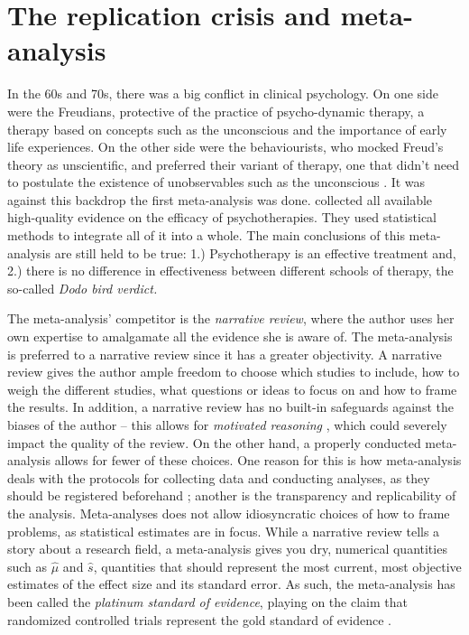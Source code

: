 \section{The replication crisis and meta-analysis}

In the 60s and 70s, there was a big conflict in clinical psychology. On one side were the Freudians, protective of the practice of psycho-dynamic therapy, a therapy based on concepts such as the unconscious and the importance of early life experiences. On the other side were the behaviourists, who mocked Freud's theory as unscientific, and preferred their variant of therapy, one that didn't need to postulate the existence of unobservables such as the unconscious \parencite[Chapter 4]{Wampold2019-fe}. It was against this backdrop the first meta-analysis was done. \cite{Smith1977-vw} collected all available high-quality evidence on the efficacy of psychotherapies. They used statistical methods to integrate all of it into a whole. The main conclusions of this meta-analysis are still held to be true: 1.) Psychotherapy is an effective treatment and, 2.) there is no difference in effectiveness between different schools of therapy, the so-called \emph{Dodo bird verdict.}

The meta-analysis' competitor is the \emph{narrative review}, where the author uses her own expertise to amalgamate all the evidence she is aware of. The meta-analysis is preferred to a narrative review since it has a greater objectivity. A narrative review gives the author ample freedom to choose which studies to include, how to weigh the different studies, what questions or ideas to focus on and how to frame the results. In addition, a narrative review has no built-in safeguards against the biases of the author -- this allows for \emph{motivated reasoning} \parencite{Kunda1990-ry}, which could severely impact the quality of the review. On the other hand, a properly conducted meta-analysis allows for fewer of these choices. One reason for this is how meta-analysis deals with the protocols for collecting data and conducting analyses, as they should be registered beforehand \parencite{Egger1997-ue}; another is the transparency and replicability of the analysis. Meta-analyses does not allow idiosyncratic choices of how to frame problems, as statistical estimates are in focus. While a narrative review tells a story about a research field, a meta-analysis gives you dry, numerical quantities such as $\widehat{\mu}$ and $\widehat{s}$, quantities that should represent the most current, most objective estimates of the effect size and its standard error. As such, the meta-analysis has been called the \emph{platinum standard of evidence}, playing on the claim that randomized controlled trials represent the gold standard of evidence \parencite{Stegenga2011-zo}.

